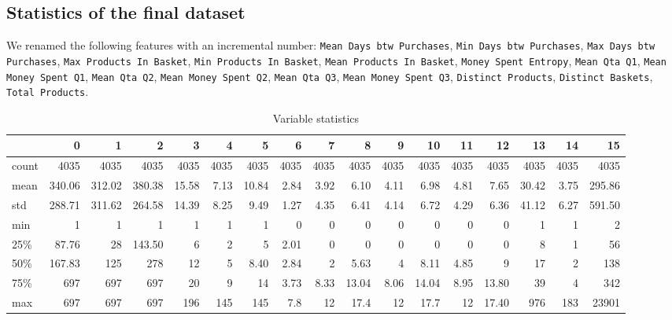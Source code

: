 \documentclass[12pt]{article}
\begin{document}
\subsection{Statistics of the final dataset}
We renamed the following features with an incremental number: \texttt{Mean Days btw Purchases}, \texttt{Min Days btw Purchases}, \texttt{Max Days btw Purchases}, \texttt{Max Products In Basket}, \texttt{Min Products In Basket}, \texttt{Mean Products In Basket}, \texttt{Money Spent Entropy}, \texttt{Mean Qta Q1}, \texttt{Mean Money Spent Q1}, \texttt{Mean Qta Q2}, \texttt{Mean Money Spent Q2}, \texttt{Mean Qta Q3}, \texttt{Mean Money Spent Q3}, \texttt{Distinct Products}, \texttt{Distinct Baskets}, \texttt{Total Products}.

\begin{table}[H]
    \centering
    \tiny
\begin{tabular}{lrrrrrrrrrrrrrrrr}
\toprule
{} & 0 & 1 & 2 & 3 & 4 & 5 & 6 & 7 & 8 & 9 & 10 & 11 & 12 & 13 & 14 & 15 \\
\midrule
count &  4035 &  4035 &  4035 &  4035 &  4035 &  4035 &  4035 &  4035 &  4035 &  4035 &  4035 &  4035 &  4035 &  4035 &  4035 &   4035 \\
mean  &   340.06 &   312.02 &   380.38 &    15.58 &     7.13 &    10.84 &     2.84 &     3.92 &     6.10 &     4.11 &     6.98 &     4.81 &     7.65&    30.42&     3.75 &    295.86 \\
std   &   288.71 &   311.62&   264.58 &    14.39&     8.25 &     9.49&     1.27 &     4.35 &     6.41 &     4.14&     6.72 &     4.29 &     6.36 &    41.12&     6.27&    591.50\\
min   &     1 &     1 &     1 &     1 &     1 &     1 &     0 &     0 &     0 &     0 &     0 &     0 &     0 &     1 &     1 &      2 \\
25\%   &    87.76&    28 &   143.50 &     6 &     2 &     5 &     2.01 &     0 &     0 &     0 &     0 &     0 &     0 &     8 &     1 &     56 \\
50\%   &   167.83&   125 &   278 &    12 &     5 &     8.40 &     2.84 &     2 &     5.63&     4 &     8.11 &     4.85 &     9 &    17 &     2 &    138 \\
75\%   &   697 &   697 &   697 &    20 &     9 &    14 &     3.73&     8.33 &    13.04 &     8.06 &    14.04&     8.95 &    13.80&    39 &     4 &    342 \\
max   &   697 &   697 &   697 &   196 &   145 &   145 &     7.8 &    12 &    17.4 &    12 &    17.7 &    12 &    17.40 &   976 &   183 &  23901 \\
\bottomrule
\end{tabular}

    \caption{Variable statistics}
    \label{tab:my_label}
\end{table}
\end{document}
